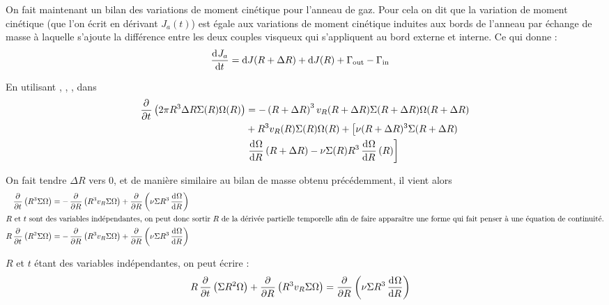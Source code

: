 \bigskip

On fait maintenant un bilan des variations de moment cinétique pour l'anneau de gaz. Pour cela on dit que la variation de moment cinétique (que l'on écrit en dérivant $J_a(t)$) est égale aux variations de moment cinétique induites aux bords de l'anneau par échange de masse à laquelle s'ajoute la différence entre les deux couples visqueux qui s'appliquent au bord externe et interne. Ce qui donne : 
\begin{align}
\mathinner{ \dfrac{\operatorname{d \!}{^{}}J_a}{\operatorname{d \!}{{t}^{}}} } &= \operatorname{d \!} J(R+\Delta R) + \operatorname{d \!} J(R) + \Gamma_\text{out} - \Gamma_\text{in}\label{eq:cons_J_a2}
\end{align}

En utilisant , , , dans 
\begin{align*}
\begin{split}
\mathinner{ \dfrac{\partial{^{}}}{\partial{{t}^{}}} }\left(2\pi R^3 \Delta R \Sigma(R)\Omega(R)\right) &= -\left(R+\Delta R\right)^3v_R(R+\Delta R) \Sigma(R+\Delta R) \Omega(R+\Delta R)\\
& + R^3 v_R(R) \Sigma(R) \Omega(R) + \left[\nu(R+\Delta R)^3\Sigma(R+\Delta R)\right.\\
&\left. \mathinner{ \dfrac{\operatorname{d \!}{^{}}\Omega}{\operatorname{d \!}{{R}^{}}} }(R+\Delta R)-\nu \Sigma(R) R^3 \mathinner{ \dfrac{\operatorname{d \!}{^{}}\Omega}{\operatorname{d \!}{{R}^{}}} }(R)\right]
\end{split}
\end{align*}



On fait tendre $\Delta R$ vers 0, et de manière similaire au bilan de masse obtenu précédemment, il vient alors 
\begin{align*}
\mathinner{ \dfrac{\partial{^{}}}{\partial{{t}^{}}} }\left(R^3 \Sigma\Omega\right) &= -\mathinner{ \dfrac{\partial{^{}}}{\partial{{R}^{}}} }\left(R^3 v_R \Sigma \Omega\right) + \mathinner{ \dfrac{\partial{^{}}}{\partial{{R}^{}}} }\left(\nu \Sigma R^3 \mathinner{ \dfrac{\operatorname{d \!}{^{}}\Omega}{\operatorname{d \!}{{R}^{}}} }\right)\\
\intertext{$R$ et $t$ sont des variables indépendantes, on peut donc sortir $R$ de la dérivée partielle temporelle afin de faire apparaître une forme qui fait penser à une équation de continuité.}
R\mathinner{ \dfrac{\partial{^{}}}{\partial{{t}^{}}} }\left(R^2 \Sigma\Omega\right) &= -\mathinner{ \dfrac{\partial{^{}}}{\partial{{R}^{}}} }\left(R^3 v_R \Sigma \Omega\right) + \mathinner{ \dfrac{\partial{^{}}}{\partial{{R}^{}}} }\left(\nu \Sigma R^3 \mathinner{ \dfrac{\operatorname{d \!}{^{}}\Omega}{\operatorname{d \!}{{R}^{}}} }\right)
\end{align*}

$R$ et $t$ étant des variables indépendantes, on peut écrire :
\begin{align}
R\mathinner{ \dfrac{\partial{^{}}}{\partial{{t}^{}}} }\left(\Sigma R^2\Omega\right) + \mathinner{ \dfrac{\partial{^{}}}{\partial{{R}^{}}} }\left(R^3 v_R \Sigma \Omega\right) &= \mathinner{ \dfrac{\partial{^{}}}{\partial{{R}^{}}} }\left(\nu \Sigma R^3 \mathinner{ \dfrac{\operatorname{d \!}{^{}}\Omega}{\operatorname{d \!}{{R}^{}}} }\right)\label{eq:ang_mom_01}
\end{align}

